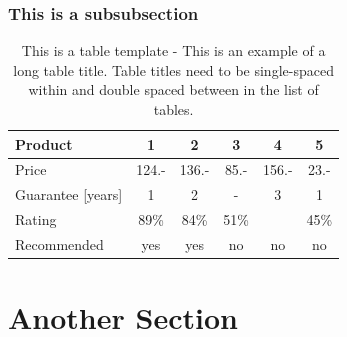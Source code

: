 \subsubsection{This is a subsubsection}
\begin{table}[H]
\centering
\caption{This is a table template - This is an example of a long table title.  Table titles need to be single-spaced within and double spaced between in the list of tables.}
\begin{tabular}{|l|c|c|c|c|c|}
\hline
Product & 1 & 2 & 3 & 4 & 5\\
\hline
Price & 124.- & 136.- & 85.- & 156.- & 23.-\\
Guarantee [years] & 1 & 2 & - & 3 & 1\\
Rating & 89\% & 84\% & 51\% & & 45\%\\
\hline
\hline
Recommended & yes & yes & no & no & no\\
\hline
\end{tabular}
\label{tab:template1-2}
\end{table}
\section{Another Section}